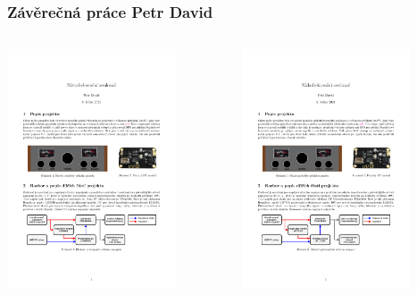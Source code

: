 \documentclass{beamer}
\begin{document}
	\begin{frame}
    \frametitle{Závěrečná práce Petr David}
		
		\begin{columns}
			\begin{column}{0.5\textwidth}
				 \includegraphics[page=1,width=5cm]{pdf/KEO-Petr_David-ZP.pdf}
			\end{column}
			\begin{column}{0.5\textwidth} 
				 \includegraphics[page=2,width=5cm]{pdf/KEO-Petr_David-ZP.pdf}
			\end{column}
		\end{columns}
	
	\end{frame}
\end{document}
